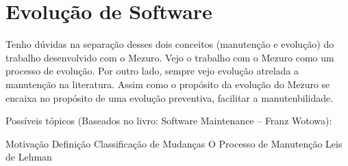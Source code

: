 \chapter{Evolução de Software}

Tenho dúvidas na separação desses dois conceitos (manutenção e evolução) do trabalho desenvolvido com o Mezuro. Vejo o trabalho com o Mezuro como um processo de evolução. Por outro lado, sempre vejo evolução atrelada a manutenção na literatura. Assim como o propósito da evolução do Mezuro se encaixa no propósito de uma evolução preventiva, facilitar a manutenbilidade.

Possíveis tópicos (Baseados no livro: Software Maintenance – Franz Wotowa):

Motivação
Definição
Classificação de Mudanças
O Processo de Manutenção
Leis de Lehman